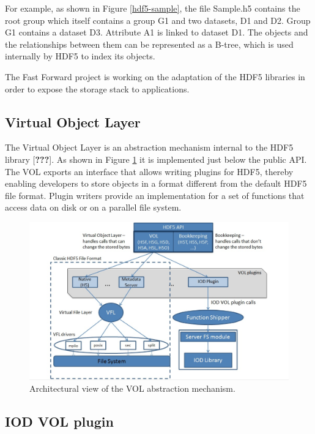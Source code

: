 \documentclass[conference]{IEEEtran}
\begin{document}
For example, as shown in Figure \ref{hdf5-sample}, the file
Sample.h5 contains the root group which itself contains a
group G1 and two datasets, D1 and D2. Group
G1 contains a dataset D3. Attribute A1 is
linked to dataset D1. The objects and the relationships between
them can be represented as a B-tree, which is used internally by HDF5 to
index its objects.

The Fast Forward project is working on the adaptation of the HDF5
libraries in order to expose the storage stack to applications.

\subsection{Virtual Object Layer}\label{virtual-object-layer}

The Virtual Object Layer is an abstraction mechanism internal to the
HDF5 library {[}\textbf{???}{]}. As shown in Figure \ref{vol-arch} it is
implemented just below the public API. The VOL exports an interface that
allows writing plugins for HDF5, thereby enabling developers to store
objects in a format different from the default HDF5 file format. Plugin
writers provide an implementation for a set of functions that access
data on disk or on a parallel file system.

\begin{figure}[htbp]
\centering
\includegraphics[scale=0.20]{images/vol-arch.png}
\caption{Architectural view of the VOL abstraction mechanism.
\label{vol-arch}}
\end{figure}

\subsection{IOD VOL plugin}\label{iod-vol-plugin}
\end{document}
